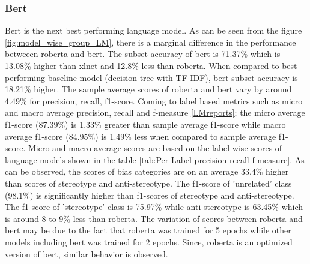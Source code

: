 
\subsubsection{Bert}
Bert is the next best performing language model. As can be seen from the figure \ref{fig:model_wise_group_LM}, there is a marginal difference in the performance betweeen roberta and bert. The subset accuracy of bert is 71.37\% which is 13.08\% higher than xlnet and 12.8\% less than roberta. When compared to best performing baseline model (decision tree with TF-IDF), bert subset accuracy is 18.21\% higher. The sample average scores of roberta and bert vary by around 4.49\% for precision, recall, f1-score. Coming to label based metrics such as micro and macro average precision, recall and f-measure \ref{LMreports}; the micro  average f1-score (87.39\%)  is 1.33\% greater than sample average f1-score while macro average f1-score (84.95\%) is 1.49\% less when compared to sample average f1-score. Micro and macro average scores are based on the label wise scores of language models shown in the table \ref{tab:Per-Label-precision-recall-f-measure}. As can be observed, the scores of bias categories are on an average 33.4\% higher than scores of stereotype and anti-stereotype. The f1-score of 'unrelated' class (98.1\%) is significantly higher than f1-scores of stereotype and anti-stereotype. The f1-score of 'stereotype' class is 75.97\% while anti-stereotype is 63.45\% which is around 8 to 9\% less than roberta. The variation of scores between roberta and bert may be due to the fact that roberta was trained for 5 epochs while other models including bert was trained for 2 epochs. Since, roberta is an optimized version of bert, similar behavior is observed. 

